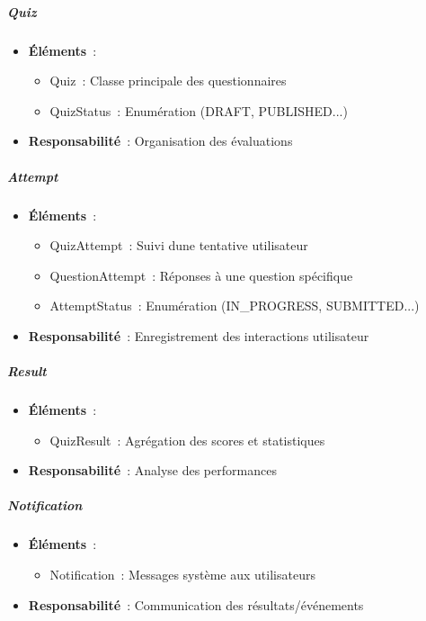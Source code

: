 \documentclass[12pt,a4paper,twoside,openright]{report}
\begin{document}
\hypertarget{quiz}{%
\subparagraph{Quiz}\label{quiz}}

\begin{itemize}
\item
  \textbf{Éléments}~:

  \begin{itemize}
  \item
    Quiz~: Classe principale des questionnaires
  \item
    QuizStatus~: Enumération (DRAFT, PUBLISHED...)
  \end{itemize}
\item
  \textbf{Responsabilité}~: Organisation des évaluations
\end{itemize}

\hypertarget{attempt}{%
\subparagraph{Attempt}\label{attempt}}

\begin{itemize}
\item
  \textbf{Éléments}~:

  \begin{itemize}
  \item
    QuizAttempt~: Suivi d\textquotesingle une tentative utilisateur
  \item
    QuestionAttempt~: Réponses à une question spécifique
  \item
    AttemptStatus~: Enumération (IN\_PROGRESS, SUBMITTED...)
  \end{itemize}
\item
  \textbf{Responsabilité}~: Enregistrement des interactions utilisateur
\end{itemize}

\hypertarget{result}{%
\subparagraph{Result}\label{result}}

\begin{itemize}
\item
  \textbf{Éléments}~:

  \begin{itemize}
  \item
    QuizResult~: Agrégation des scores et statistiques
  \end{itemize}
\item
  \textbf{Responsabilité}~: Analyse des performances
\end{itemize}

\hypertarget{notification}{%
\subparagraph{Notification}\label{notification}}

\begin{itemize}
\item
  \textbf{Éléments}~:

  \begin{itemize}
  \item
    Notification~: Messages système aux utilisateurs
  \end{itemize}
\item
  \textbf{Responsabilité}~: Communication des résultats/événements
\end{itemize}
\end{document}
